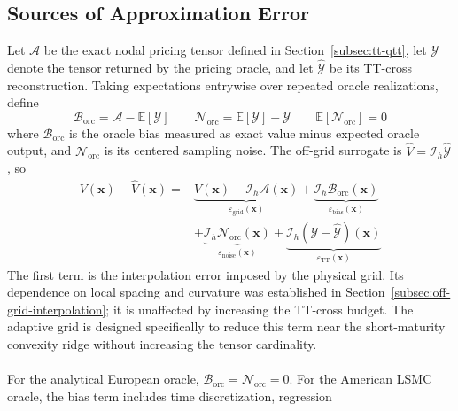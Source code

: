 \documentclass{article}
\numberwithin{equation}{subsection}
\theoremstyle{definition}
\theoremstyle{remark}
\begin{document}
\subsection{Sources of Approximation Error}
\label{subsec:error-sources}
Let \(\mathcal{A}\) be the exact nodal pricing tensor defined in
Section~\ref{subsec:tt-qtt}, let \(\mathcal{Y}\) denote the tensor returned by
the pricing oracle, and let \(\widehat{\mathcal{Y}}\) be its TT-cross
reconstruction. Taking expectations entrywise over repeated oracle
realizations, define
\begin{equation}
\mathcal{B}_{\mathrm{orc}}
=
\mathcal{A}
-
\mathbb{E}\left[\mathcal{Y}\right]
\qquad
\mathcal{N}_{\mathrm{orc}}
=
\mathbb{E}\left[\mathcal{Y}\right]
-
\mathcal{Y}
\qquad
\mathbb{E}\left[\mathcal{N}_{\mathrm{orc}}\right]=0
\label{eq:oracle-bias-noise}
\end{equation}
where \(\mathcal{B}_{\mathrm{orc}}\) is the oracle bias measured as exact value
minus expected oracle output, and \(\mathcal{N}_{\mathrm{orc}}\) is its
centered sampling noise. The off-grid surrogate is
\(\widehat V=\mathcal{I}_h\widehat{\mathcal{Y}}\), so
\begin{equation}
\begin{aligned}
V(\boldsymbol{x})-\widehat V(\boldsymbol{x})
={}&
\underbrace{
V(\boldsymbol{x})
-
\mathcal{I}_h\mathcal{A}(\boldsymbol{x})
}_{\varepsilon_{\mathrm{grid}}(\boldsymbol{x})}
+
\underbrace{
\mathcal{I}_h\mathcal{B}_{\mathrm{orc}}(\boldsymbol{x})
}_{\varepsilon_{\mathrm{bias}}(\boldsymbol{x})}
\\
&+
\underbrace{
\mathcal{I}_h\mathcal{N}_{\mathrm{orc}}(\boldsymbol{x})
}_{\varepsilon_{\mathrm{noise}}(\boldsymbol{x})}
+
\underbrace{
\mathcal{I}_h
\left(
\mathcal{Y}-\widehat{\mathcal{Y}}
\right)(\boldsymbol{x})
}_{\varepsilon_{\mathrm{TT}}(\boldsymbol{x})}
\end{aligned}
\label{eq:complete-error-decomposition}
\end{equation}
The first term is the interpolation error imposed by the physical grid. Its
dependence on local spacing and curvature was established in
Section~\ref{subsec:off-grid-interpolation}; it is unaffected by increasing the
TT-cross budget. The adaptive grid is designed specifically to reduce this
term near the short-maturity convexity ridge without increasing the tensor
cardinality.\\
\\
For the analytical European oracle,
\(\mathcal{B}_{\mathrm{orc}}=\mathcal{N}_{\mathrm{orc}}=0\). For the American
LSMC oracle, the bias term includes time discretization, regression
\end{document}
